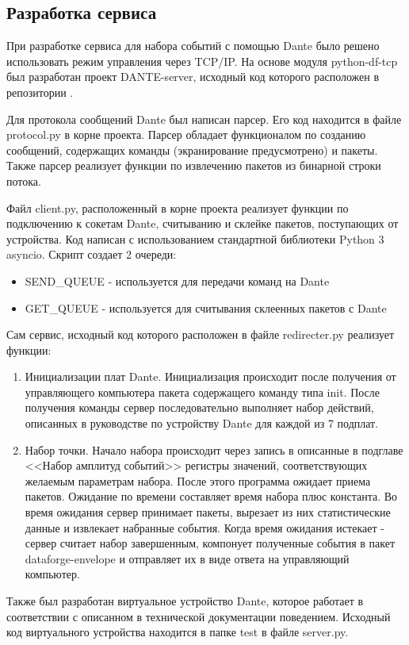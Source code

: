 \documentclass[a4paper,14pt]{extreport}
\begin{document}
\subsection{Разработка сервиса}
При разработке сервиса для набора событий с помощью Dante было решено использовать режим управления через TCP/IP. На основе модуля python-df-tcp был разработан проект DANTE-server, исходный код которого расположен в репозитории \cite{dante-server}.

Для протокола сообщений Dante был написан парсер. Его код находится в файле protocol.py в корне проекта. Парсер обладает функционалом по созданию сообщений, содержащих команды (экранирование предусмотрено) и пакеты. Также парсер реализует функции по извлечению пакетов из бинарной строки потока.

Файл client.py, расположенный в корне проекта реализует функции по подключению к сокетам Dante, считыванию и склейке пакетов, поступающих от устройства. Код написан с использованием стандартной библиотеки Python 3 asyncio. Скрипт создает 2 очереди:

\begin{itemize}
\item SEND\_QUEUE - используется для передачи команд на Dante
\item GET\_QUEUE - используется для считывания склеенных пакетов с Dante
\end{itemize}
Сам сервис, исходный код которого расположен в файле redirecter.py реализует функции:

\begin{enumerate}
\item Инициализации плат Dante. Инициализация происходит после получения от управляющего компьютера пакета содержащего команду типа init. После получения команды сервер последовательно выполняет набор действий, описанных в руководстве по устройству Dante для каждой из 7 подплат. 
\item Набор точки. Начало набора происходит через запись в описанные в подглаве <<Набор амплитуд событий>> регистры значений, соответствующих желаемым параметрам набора. После этого программа ожидает приема пакетов. Ожидание по времени составляет время набора плюс константа. Во время ожидания сервер принимает пакеты, вырезает из них статистические данные и извлекает набранные события. Когда время ожидания истекает - сервер считает набор завершенным, компонует полученные события в пакет dataforge-envelope и отправляет их в виде ответа на управляющий компьютер.
\end{enumerate}
Также был разработан виртуальное устройство Dante, которое работает в соответствии с описанном в технической документации поведением. Исходный код виртуального устройства находится в папке test в файле server.py.
\end{document}
